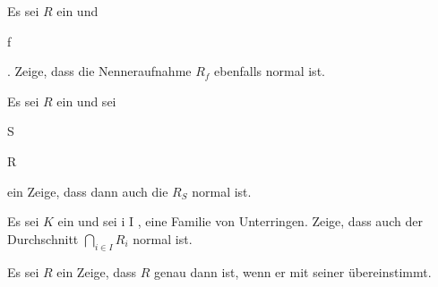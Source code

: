 {} {}



{}

{


Es sei $R$ ein
und

 {}

 {f } {}

 {} {} {} {.} Zeige, dass die Nenneraufnahme $R_f$ ebenfalls normal ist.


}

{} {}



{}

{


Es sei $R$ ein
und sei


\mavergleichskette

{\vergleichskette

{S
}

{ \subseteq }{ R
}

{  }{
}

{    }{
}

{   }{
}

}
{}{}{}
ein
Zeige, dass dann auch die
$R_S$ normal ist.


}

{} {}



{}

{


Es sei $K$ ein
und sei  { i \in I  }{,} eine Familie von
Unterringen. Zeige, dass auch der Durchschnitt $\bigcap_{i \in I} R_i$ normal ist.


}

{} {}



{}

{


Es sei $R$ ein
Zeige, dass $R$ genau dann
ist, wenn er mit seiner
übereinstimmt.


}

{} {}



